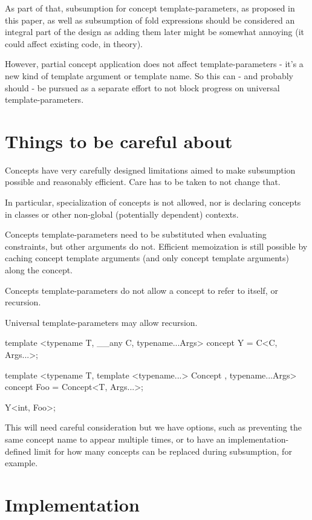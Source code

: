 \documentclass{wg21}
\begin{document}
As part of that, subsumption for concept template-parameters, as proposed in this paper, as well as subsumption of fold expressions
should be considered an integral part of the design as adding them later might be somewhat annoying (it could affect existing code, in theory).

However, partial concept application does not affect template-parameters - it's a new kind of template argument or template name.
So this can - and probably should - be pursued as a separate effort to not block progress on universal template-parameters.

\section{Things to be careful about}

Concepts have very carefully designed limitations aimed to make subsumption possible and reasonably efficient.
Care has to be taken to not change that.

In particular, specialization of concepts is not allowed, nor is declaring concepts in classes or other non-global (potentially dependent)
contexts.

Concepts template-parameters need to be substituted when evaluating constraints, but other arguments do not.
Efficient memoization is still possible by caching concept template arguments (and only concept template arguments) along the concept.

Concepts template-parameters do not allow a concept to refer to itself, or recursion.

Universal template-parameters may allow recursion.

\begin{colorblock}
template <typename T, __any C, typename...Args>
concept Y = C<C, Args...>;

template <typename T, template <typename...> Concept , typename...Args>
concept Foo = Concept<T, Args...>;

Y<int, Foo>;
\end{colorblock}

This will need careful consideration but we have options, such as preventing the same concept name to appear multiple times,
or to have an implementation-defined limit for how many concepts can be replaced during subsumption, for example.

\section{Implementation}
\end{document}
